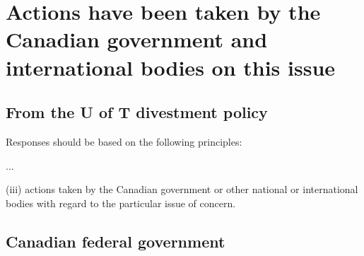 \documentclass[10pt]{article}
\newenvironment{itquote}{%
  \quote
  \itshape
}{%
  \endquote
}
\begin{document}






\clearpage



		\singlespacing
		\section{Actions have been taken by the Canadian government and international bodies on this issue}
		\label{sec:ActionsTaken}
		\doublespacing
		





		\subsection{From the U of T divestment policy}



\begin{itquote}	
Responses should be based on the following principles:

...

(iii) actions taken by the Canadian government or other national or international bodies with regard to the particular issue of concern.
\end{itquote}


		
		\subsection{Canadian federal government}
		
		
		
\end{document}

